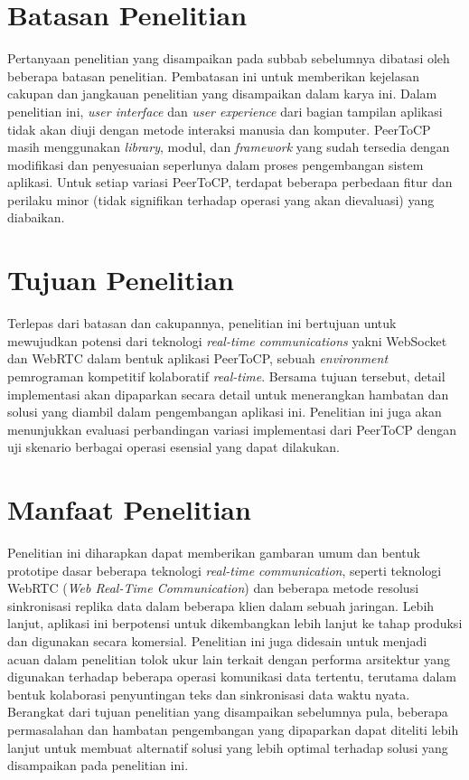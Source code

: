 \section{Batasan Penelitian}
\label{sec:batasanMasalah}
Pertanyaan penelitian yang disampaikan pada subbab sebelumnya dibatasi oleh beberapa batasan penelitian. Pembatasan ini untuk memberikan kejelasan cakupan dan jangkauan penelitian yang disampaikan dalam karya ini. Dalam penelitian ini, \textit{user interface} dan \textit{user experience} dari bagian tampilan aplikasi tidak akan diuji dengan metode interaksi manusia dan komputer. PeerToCP masih menggunakan \textit{library}, modul, dan \textit{framework} yang sudah tersedia dengan modifikasi dan penyesuaian seperlunya dalam proses pengembangan sistem aplikasi. Untuk setiap variasi PeerToCP, terdapat beberapa perbedaan fitur dan perilaku minor (tidak signifikan terhadap operasi yang akan dievaluasi) yang diabaikan.

\section{Tujuan Penelitian}
\label{sec:tujuan}
Terlepas dari batasan dan cakupannya, penelitian ini bertujuan untuk mewujudkan potensi dari teknologi \textit{real-time communications} yakni WebSocket dan WebRTC dalam bentuk aplikasi PeerToCP, sebuah \textit{environment} pemrograman kompetitif kolaboratif \textit{real-time}. Bersama tujuan tersebut, detail implementasi akan dipaparkan secara detail untuk menerangkan hambatan dan solusi yang diambil dalam pengembangan aplikasi ini. Penelitian ini juga akan menunjukkan evaluasi perbandingan variasi implementasi dari PeerToCP dengan uji skenario berbagai operasi esensial yang dapat dilakukan.

\section{Manfaat Penelitian}
\label{sec:manfaat}
Penelitian ini diharapkan dapat memberikan gambaran umum dan bentuk prototipe dasar beberapa teknologi \textit{real-time communication}, seperti teknologi WebRTC (\textit{Web Real-Time Communication}) dan beberapa metode resolusi sinkronisasi replika data dalam beberapa klien dalam sebuah jaringan. Lebih lanjut, aplikasi ini berpotensi untuk dikembangkan lebih lanjut ke tahap produksi dan digunakan secara komersial. Penelitian ini juga didesain untuk menjadi acuan dalam penelitian tolok ukur lain terkait dengan performa arsitektur yang digunakan terhadap beberapa operasi komunikasi data tertentu, terutama dalam bentuk kolaborasi penyuntingan teks dan sinkronisasi data waktu nyata. Berangkat dari tujuan penelitian yang disampaikan sebelumnya pula, beberapa permasalahan dan hambatan pengembangan yang dipaparkan dapat diteliti lebih lanjut untuk membuat alternatif solusi yang lebih optimal terhadap solusi yang disampaikan pada penelitian ini.

